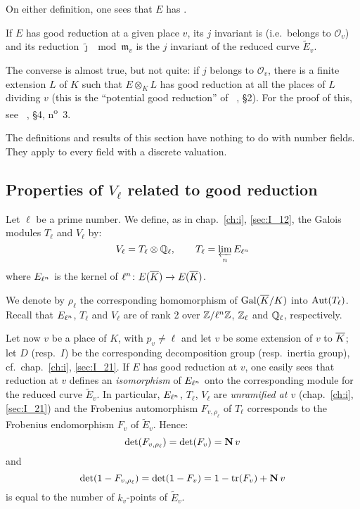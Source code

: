 On either definition, one sees that $E$ has .

If $E$ has good reduction at a given place $v$, its $j$ invariant is
 (i.e.\ belongs to $\mathcal{O}_v$) and its reduction
$\tilde\jmath \mod{\mathfrak{m}_v}$ is the $j$ invariant of the reduced curve
$\widetilde{E}_v$.

The converse is almost true, but not quite: if $j$ belongs to $\mathcal{O}_v$,
there is a finite extension $L$ of $K$ such that $E \otimes_K L$ has good
reduction at all the places of $L$ dividing $v$ (this is the ``potential good
reduction'' of \citeauthor{32}~\cite{32}, \S 2). For the proof of this, see
\citeauthor{29}~\cite{29}, \S 4, n\textsuperscript{o}~3.

\begin{obs}
The definitions and results of this section have nothing to do with number
fields. They apply to every field with a discrete valuation.
\end{obs}

\subsection{Properties of \texorpdfstring{$V_\ell$}{Vℓ} related to good
reduction}\label{sec:IV_13}
Let $\ell$ be a prime number. We define, as in chap.~\ref{ch:i},
\ref{sec:I_12}, the Galois modules $T_\ell$ and $V_\ell$ by:
\[
	V_\ell = T_\ell \otimes \mathbb{Q}_\ell, \qquad T_\ell = \varprojlim_n
	{E}_{\ell^n}
\]
where ${E}_{\ell^n}$ is the kernel of $\ell^n \colon E(\overline{K}) \to
E(\overline{K})$.
\dpage

We denote by $\rho_\ell$ the corresponding homomorphism of $\operatorname{Gal}(\overline{K}/K)$
into $\operatorname{Aut}(T_\ell)$. Recall that ${E}_{\ell^n}$, $T_\ell$ and $V_\ell$ are
of rank 2 over $\mathbb{Z}/\ell^n\mathbb{Z}$, $\mathbb{Z}_\ell$ and $\mathbb{Q}_\ell$, respectively.

Let now $v$ be a place of $K$, with $p_v \ne \ell$ and let $v$ be some
extension of $v$ to $\overline{K}$; let $D$ (resp.\ $I$) be the corresponding
decomposition group (resp.\ inertia group), cf.\ chap.~\ref{ch:i},
\ref{sec:I_21}. If $E$ has good reduction at $v$, one easily sees that
reduction at $v$ defines an \emph{isomorphism} of ${E}_{\ell^n}$ onto the
corresponding module for the reduced curve $\widetilde{E}_v$. In particular,
${E}_{\ell^n}$, $T_\ell$, $V_\ell$ are \emph{unramified at $v$}
(chap.~\ref{ch:i}, \ref{sec:I_21}) and the Frobenius automorphism $F_{v,
\rho_\ell}$ of $T_\ell$ corresponds to the Frobenius endomorphism $F_v$ of
$\widetilde{E}_v$. Hence: 
\[
	\det(F_{v, \rho_\ell}) = \det(F_v) = \operatorname{\mathbf{N}} v
\]
and
\[
	\det(1 - F_{v, \rho_\ell}) = \det(1 - F_v) = 1 - \operatorname{tr}(F_v)
	+ \operatorname{\mathbf{N}} v
\]
is equal to the number of $k_v$-points of $\widetilde{E}_v$.

